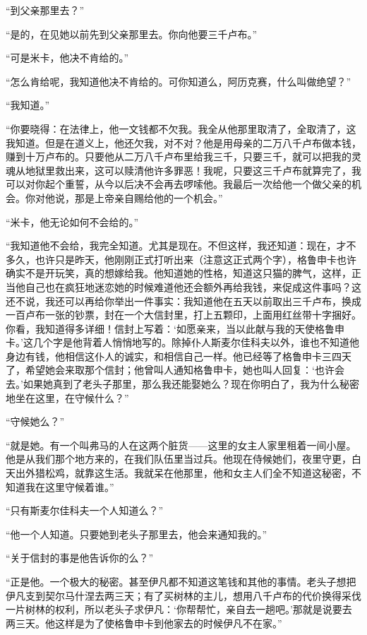 \par “到父亲那里去？”
\par “是的，在见她以前先到父亲那里去。你向他要三千卢布。”
\par “可是米卡，他决不肯给的。”
\par “怎么肯给呢，我知道他决不肯给的。可你知道么，阿历克赛，什么叫做绝望？”
\par “我知道。”
\par “你要晓得：在法律上，他一文钱都不欠我。我全从他那里取清了，全取清了，这我知道。但是在道义上，他还欠我，对不对？他是用母亲的二万八千卢布做本钱，赚到十万卢布的。只要他从二万八千卢布里给我三千，只要三千，就可以把我的灵魂从地狱里救出来，这可以赎清他许多罪恶！我呢，只要这三千卢布就算完了，我可以对你起个重誓，从今以后决不会再去啰嗦他。我最后一次给他一个做父亲的机会。你对他说，那是上帝亲自赐给他的一个机会。”
\par “米卡，他无论如何不会给的。”
\par “我知道他不会给，我完全知道。尤其是现在。不但这样，我还知道：现在，才不多久，也许只是昨天，他刚刚正式打听出来（注意这正式两个字），格鲁申卡也许确实不是开玩笑，真的想嫁给我。他知道她的性格，知道这只猫的脾气，这样，正当他自己也在疯狂地迷恋她的时候难道他还会额外再给我钱，来促成这件事吗？这还不说，我还可以再给你举出一件事实：我知道他在五天以前取出三千卢布，换成一百卢布一张的钞票，封在一个大信封里，打上五颗印，上面用红丝带十字捆好。你看，我知道得多详细！信封上写着：‘如愿亲来，当以此献与我的天使格鲁申卡。’这几个字是他背着人悄悄地写的。除掉仆人斯麦尔佳科夫以外，谁也不知道他身边有钱，他相信这仆人的诚实，和相信自己一样。他已经等了格鲁申卡三四天了，希望她会来取那个信封；他曾叫人通知格鲁申卡，她也叫人回复：‘也许会去。’如果她真到了老头子那里，那么我还能娶她么？现在你明白了，我为什么秘密地坐在这里，在守候什么？”
\par “守候她么？”
\par “就是她。有一个叫弗马的人在这两个脏货——这里的女主人家里租着一间小屋。他是从我们那个地方来的，在我们队伍里当过兵。他现在侍候她们，夜里守更，白天出外猎松鸡，就靠这生活。我就呆在他那里，他和女主人们全不知道这秘密，不知道我在这里守候着谁。”
\par “只有斯麦尔佳科夫一个人知道么？”
\par “他一个人知道。只要她到老头子那里去，他会来通知我的。”
\par “关于信封的事是他告诉你的么？”
\par “正是他。一个极大的秘密。甚至伊凡都不知道这笔钱和其他的事情。老头子想把伊凡支到契尔马什涅去两三天；有了买树林的主儿，想用八千卢布的代价换得采伐一片树林的权利，所以老头子求伊凡：‘你帮帮忙，亲自去一趟吧。’那就是说要去两三天。他这样是为了使格鲁申卡到他家去的时候伊凡不在家。”

